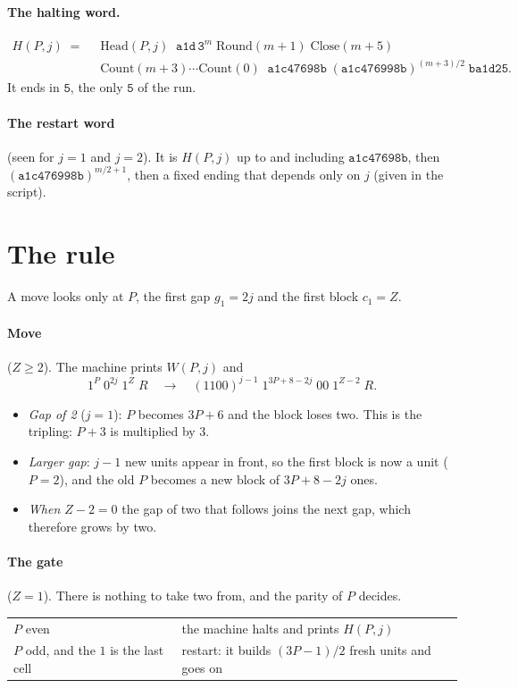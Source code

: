 \documentclass[11pt]{article}
\theoremstyle{remark}
\newcommand{\w}[1]{\mathtt{#1}}
\newcommand{\nm}[1]{\mathrm{#1}}
\begin{document}
\paragraph{The halting word.}
\begin{align*}
H(P,j) \;=\;\; & \nm{Head}(P,j)\;\;\w{a1d}\,\w3^{m}\;\nm{Round}(m+1)\;\nm{Close}(m+5)\\
 & \nm{Count}(m+3)\cdots\nm{Count}(0)\;\;\w{a1c47698b}\;(\w{a1c476998b})^{(m+3)/2}\;\w{ba1d25}.
\end{align*}
It ends in $\w5$, the only $\w5$ of the run.

\paragraph{The restart word} (seen for $j=1$ and $j=2$). It is $H(P,j)$ up to
and including $\w{a1c47698b}$, then $(\w{a1c476998b})^{m/2+1}$, then a fixed
ending that depends only on $j$ (given in the script).

\section{The rule}

A move looks only at $P$, the first gap $g_1=2j$ and the first block $c_1=Z$.

\paragraph{Move} ($Z\ge2$). The machine prints $W(P,j)$ and
\[
1^{P}\;0^{2j}\;1^{Z}\;R \quad\longrightarrow\quad
(1100)^{j-1}\;1^{3P+8-2j}\;00\;1^{Z-2}\;R .
\]
\begin{itemize}
\item \emph{Gap of 2} ($j=1$): $P$ becomes $3P+6$ and the block loses two. This
is the tripling: $P+3$ is multiplied by $3$.
\item \emph{Larger gap}: $j-1$ new units appear in front, so the first block is
now a unit ($P=2$), and the old $P$ becomes a new block of $3P+8-2j$ ones.
\item \emph{When $Z-2=0$} the gap of two that follows joins the next gap, which
therefore grows by two.
\end{itemize}

\paragraph{The gate} ($Z=1$). There is nothing to take two from, and the parity
of $P$ decides.
\begin{center}
\begin{tabular}{@{}l>{\raggedright\arraybackslash}p{}@{}}
\toprule
$P$ even & the machine halts and prints $H(P,j)$\\
$P$ odd, and the $1$ is the last cell & restart: it builds $(3P-1)/2$ fresh
units and goes on\\
\bottomrule
\end{tabular}
\end{center}
\end{document}
